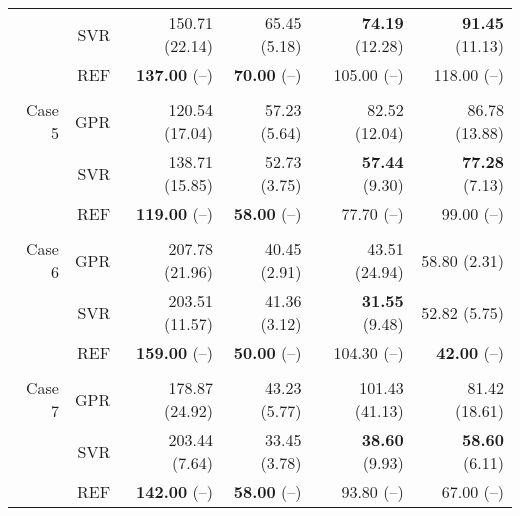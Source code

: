 \begin{table}
{\begin{tabular}{rrrrrr}
        &       SVR &         150.71 (22.14) &         65.45 (5.18)&  { \bf 74.19} (12.28) &   { \bf 91.45} (11.13)  \\
        &       REF &     { \bf 137.00} (--) &    { \bf 70.00} (--)&           105.00 (--) &            118.00 (--)  \\\\
 Case 5 &       GPR &         120.54 (17.04) &         57.23 (5.64)&         82.52 (12.04) &          86.78 (13.88)  \\
        &       SVR &         138.71 (15.85) &         52.73 (3.75)&   { \bf 57.44} (9.30) &    { \bf 77.28} (7.13)  \\
        &       REF &     { \bf 119.00} (--) &    { \bf 58.00} (--)&            77.70 (--) &             99.00 (--)  \\\\
 Case 6 &       GPR &         207.78 (21.96) &         40.45 (2.91)&         43.51 (24.94) &           58.80 (2.31)  \\
        &       SVR &         203.51 (11.57) &         41.36 (3.12)&   { \bf 31.55} (9.48) &           52.82 (5.75)  \\
        &       REF &     { \bf 159.00} (--) &    { \bf 50.00} (--)&           104.30 (--) &      { \bf 42.00} (--)  \\\\
 Case 7 &       GPR &         178.87 (24.92) &         43.23 (5.77)&        101.43 (41.13) &          81.42 (18.61)  \\
        &       SVR &          203.44 (7.64) &         33.45 (3.78)&   { \bf 38.60} (9.93) &    { \bf 58.60} (6.11)  \\
        &       REF &     { \bf 142.00} (--) &    { \bf 58.00} (--)&            93.80 (--) &             67.00 (--)  \\
\hline
\end{tabular}
}
\end{table}

